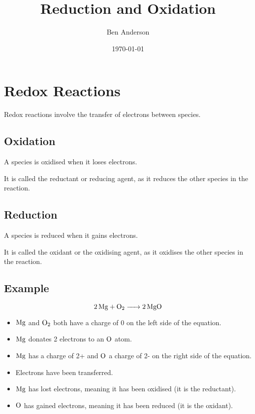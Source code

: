 \documentclass[a4paper,11pt]{article}
\begin{document}
\title{Reduction and Oxidation}
\author{Ben Anderson}
\date{\today}
\maketitle
\pagebreak

\tableofcontents
\pagebreak


\section{Redox Reactions}

Redox reactions involve the transfer of electrons between species.

\subsection{Oxidation}

A species is oxidised when it loses electrons.

It is called the reductant or reducing agent, as it reduces the other species
in the reaction.

\subsection{Reduction}

A species is reduced when it gains electrons.

It is called the oxidant or the oxidising agent, as it oxidises the other
species in the reaction.

\subsection{Example}

$$
\ce{2Mg + O2 -> 2MgO}
$$

\begin{itemize}
\item $\ce{Mg}$ and $\ce{O2}$ both have a charge of 0 on the left side of the
	equation.
\item $\ce{Mg}$ donates 2 electrons to an $\ce{O}$ atom.
\item $\ce{Mg}$ has a charge of 2+ and $\ce{O}$ a charge of 2- on the right side
	of the equation.
\item Electrons have been transferred.
\item $\ce{Mg}$ has lost electrons, meaning it has been oxidised (it is the
	reductant).
\item $\ce{O}$ has gained electrons, meaning it has been reduced (it is the
	oxidant).
\end{itemize}
\end{document}
